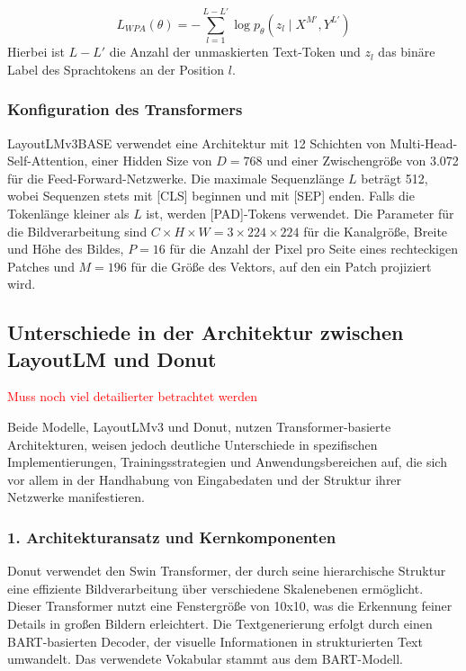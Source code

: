 \documentclass[12pt,a4paper,twoside]{article}
\newcommand\myworries[1]{\textcolor{red}{#1}}
\begin{document}
\[
L_{WPA}(\theta) = -\sum_{l=1}^{L-L'} \log p_{\theta}(z_l \mid X^{M'}, Y^{L'})
\]
Hierbei ist \(L-L'\) die Anzahl der unmaskierten Text-Token und \(z_l\) das binäre Label des Sprachtokens an der Position \(l\).

\subsubsection{Konfiguration des Transformers}
LayoutLMv3BASE verwendet eine Architektur mit 12 Schichten von Multi-Head-Self-Attention, einer Hidden Size von \(D = 768\) und einer Zwischengröße von 3.072 für die Feed-Forward-Netzwerke. Die maximale Sequenzlänge \(L\) beträgt 512, wobei Sequenzen stets mit [CLS] beginnen und mit [SEP] enden. Falls die Tokenlänge kleiner als \(L\) ist, werden [PAD]-Tokens verwendet. Die Parameter für die Bildverarbeitung sind \(C \times H \times W = 3 \times 224 \times 224\) für die Kanalgröße, Breite und Höhe des Bildes, \(P = 16\) für die Anzahl der Pixel pro Seite eines rechteckigen Patches und \(M = 196\) für die Größe des Vektors, auf den ein Patch projiziert wird.

\cite{layoutlmv3-paper}
\cite{ViLBERT-paper}
\cite{Layoutlmv3-medium}

\subsection{Unterschiede in der Architektur zwischen LayoutLM und Donut}
\myworries{Muss noch viel detailierter betrachtet werden}

Beide Modelle, LayoutLMv3 und Donut, nutzen Transformer-basierte Architekturen, weisen jedoch deutliche Unterschiede in spezifischen Implementierungen, Trainingsstrategien und Anwendungsbereichen auf, die sich vor allem in der Handhabung von Eingabedaten und der Struktur ihrer Netzwerke manifestieren.

\subsubsection*{1. Architekturansatz und Kernkomponenten}
Donut verwendet den Swin Transformer, der durch seine hierarchische Struktur eine effiziente Bildverarbeitung über verschiedene Skalenebenen ermöglicht. Dieser Transformer nutzt eine Fenstergröße von 10x10, was die Erkennung feiner Details in großen Bildern erleichtert. Die Textgenerierung erfolgt durch einen BART-basierten Decoder, der visuelle Informationen in strukturierten Text umwandelt. Das verwendete Vokabular stammt aus dem BART-Modell.
\end{document}
